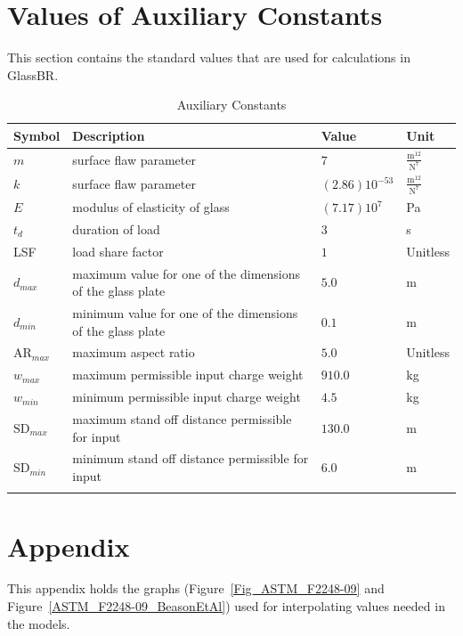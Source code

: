 \documentclass[12pt]{article}
\begin{document}
\section{Values of Auxiliary Constants}
\label{Sec:ValuofAuxiCons}
This section contains the standard values that are used for calculations in
GlassBR.

\begin{longtabu}{l X[l] l l}
\toprule
Symbol & Description & Value & Unit
\\
\midrule
$m$ & surface flaw parameter & $7$ & $\frac{\text{m}^{12}}{\text{N}^{7}}$
\\
$k$ & surface flaw parameter & $\left(2.86\right)10^{-53}$ & $\frac{\text{m}^{12}}{\text{N}^{7}}$
\\
$E$ & modulus of elasticity of glass & $\left(7.17\right)10^{7}$ & Pa
\\
${t_{d}}$ & duration of load & $3$ & s
\\
LSF & load share factor & $1$ & Unitless
\\
${d_{max}}$ & maximum value for one of the dimensions of the glass plate & $5.0$ & m
\\
${d_{min}}$ & minimum value for one of the dimensions of the glass plate & $0.1$ & m
\\
${\text{AR}_{max}}$ & maximum aspect ratio & $5.0$ & Unitless
\\
${w_{max}}$ & maximum permissible input charge weight & $910.0$ & kg
\\
${w_{min}}$ & minimum permissible input charge weight & $4.5$ & kg
\\
${\text{SD}_{max}}$ & maximum stand off distance permissible for input & $130.0$ & m
\\
${\text{SD}_{min}}$ & minimum stand off distance permissible for input & $6.0$ & m
\\
\bottomrule
\caption{Auxiliary Constants}
\label{Table:AuxiCons}
\end{longtabu}




\section{Appendix}

This appendix holds the graphs (Figure~\ref{Fig_ASTM_F2248-09} and
Figure~\ref{ASTM_F2248-09_BeasonEtAl}) used for interpolating values needed in
the models.
\end{document}
